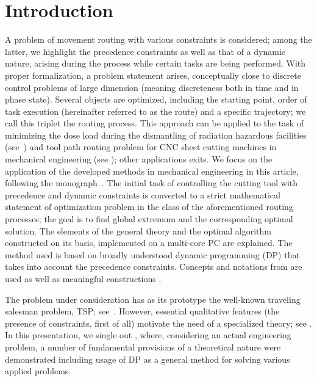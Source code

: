 \documentclass[numbers,sort&compress]{IntechOpen-Book}%
\begin{document}
\section{Introduction}
\label{sec:intro}

A problem of movement routing
with various constraints is considered;
among the latter, we highlight
the precedence constraints
as well as that of a dynamic nature,
arising during the process while certain tasks are being performed.
With proper formalization, a problem statement arises,
conceptually close to discrete control problems of large dimension
(meaning discreteness both in time and in phase state).
Several objects are optimized,
including the starting point,
order of task execution
(hereinafter referred to as the route)
and a specific trajectory;
we call this triplet
the routing process.
This approach can be applied
to  the task of minimizing the dose load
during the dismantling of radiation hazardous facilities
(see~\cite {1,3})
and tool path routing problem
for CNC sheet cutting machines
in mechanical engineering (see \cite {4,5});
other applications exits.
We focus on the application of the developed methods in mechanical engineering
in this article,
following the monograph~\cite{4}.
The initial task of controlling the cutting tool
with precedence and dynamic constraints
is converted to a strict mathematical statement of
optimization problem
in the class of the aforementioned routing processes;
the goal is to find
global extremum and the corresponding optimal solution.
The elements of the general theory and
the optimal algorithm constructed on its basis,
implemented on a multi-core PC
are explained.
The method used is based on
broadly understood dynamic programming
(DP)
that takes into account the precedence constraints.
Concepts and notations from
\cite[part II]{4}
are used
as well as
meaningful constructions
\cite[part I]{4}.

The problem under consideration
has as its prototype the well-known
traveling salesman problem,
TSP;
see~\cite{7,8,9,10,11,12}.
However, essential qualitative features
(the presence of constraints, first of all)
motivate the need of a specialized theory;
see \cite {1,3,4,5,14}.
In this presentation,
we single out \cite{4},
where, considering an actual engineering problem,
a number of fundamental provisions of a theoretical nature
were demonstrated
including usage of
DP
as a general method for solving various applied problems.
\end{document}
